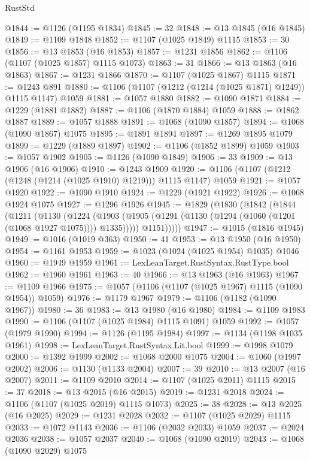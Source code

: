 \begin{lexlean}{RustStd}
\begin{coremodule}
{\begin{coremodule}
{{{{{{{{{{{{{{{{{{{{{{{{{{{{{{{{{{{@1844 := @1126 (@1195 @1834)
@1845 := 32
@1848 := @13 @1845 (@16 @1845)
@1849 := @1109 @1848
@1852 := @1107 (@1025 @1849) @1115
@1853 := 30
@1856 := @13 @1853 (@16 @1853)
@1857 := @1231 @1856
@1862 := @1106 (@1107 (@1025 @1857) @1115 @1073)
@1863 := 31
@1866 := @13 @1863 (@16 @1863)
@1867 := @1231 @1866
@1870 := @1107 (@1025 @1867) @1115
@1871 := @1243 @891
@1880 := @1106 (@1107 (@1212 (@1214 (@1025 @1871) @1249)) @1115 @1147) @1059
@1881 := @1057 @1880
@1882 := @1090 @1871
@1884 := @1229 (@1881 @1882)
@1887 := @1106 (@1870 @1884) @1059
@1888 := @1862 @1887
@1889 := @1057 @1888
@1891 := @1068 (@1090 @1857)
@1894 := @1068 (@1090 @1867) @1075
@1895 := @1891 @1894
@1897 := @1269 @1895 @1079
@1899 := @1229 (@1889 @1897)
@1902 := @1106 (@1852 @1899) @1059
@1903 := @1057 @1902
@1905 := @1126 (@1090 @1849)
@1906 := 33
@1909 := @13 @1906 (@16 @1906)
@1910 := @1243 @1909
@1920 := @1106 (@1107 (@1212 (@1248 (@1214 (@1025 @1910) @1219))) @1115 @1147) @1059
@1921 := @1057 @1920
@1922 := @1090 @1910
@1924 := @1229 (@1921 @1922)
@1926 := @1068 @1924 @1075
@1927 := @1296 @1926
@1945 := @1829
    (@1830
      (@1842
        (@1844
          (@1211
            (@1130
              (@1224
                (@1903 (@1905 (@1291 (@1130 (@1294 (@1060 (@1201 (@1068 @1927 @1075)))) @1335)))))
              @1151)))))
@1947 := @1015 (@1816 @1945)
@1949 := @1016 (@1019 @363)
@1950 := 41
@1953 := @13 @1950 (@16 @1950)
@1954 := @1161 @1953
@1959 := @1023 (@1024 (@1025 @1954) @1035) @1046
@1960 := @1949 @1959
@1961 := LexLeanTarget.RustSyntax.RustType.bool
@1962 := @1960 @1961
@1963 := 40
@1966 := @13 @1963 (@16 @1963)
@1967 := @1109 @1966
@1975 := @1057 (@1106 (@1107 (@1025 @1967) @1115 (@1090 @1954)) @1059)
@1976 := @1179 @1967
@1979 := @1106 (@1182 (@1090 @1967))
@1980 := 36
@1983 := @13 @1980 (@16 @1980)
@1984 := @1109 @1983
@1990 := @1106 (@1107 (@1025 @1984) @1115 @1091) @1059
@1992 := @1057 (@1979 @1990)
@1994 := @1126 (@1195 @1984)
@1997 := @1134 (@1198 @1035 @1961)
@1998 := LexLeanTarget.RustSyntax.Lit.bool
@1999 := @1998 @1079
@2000 := @1392 @1999
@2002 := @1068 @2000 @1075
@2004 := @1060 (@1997 @2002)
@2006 := @1130 (@1133 @2004)
@2007 := 39
@2010 := @13 @2007 (@16 @2007)
@2011 := @1109 @2010
@2014 := @1107 (@1025 @2011) @1115
@2015 := 37
@2018 := @13 @2015 (@16 @2015)
@2019 := @1231 @2018
@2024 := @1106 (@1107 (@1025 @2019) @1115 @1073)
@2025 := 38
@2028 := @13 @2025 (@16 @2025)
@2029 := @1231 @2028
@2032 := @1107 (@1025 @2029) @1115
@2033 := @1072 @1143
@2036 := @1106 (@2032 @2033) @1059
@2037 := @2024 @2036
@2038 := @1057 @2037
@2040 := @1068 (@1090 @2019)
@2043 := @1068 (@1090 @2029) @1075
}}}}}}}}}}}}}}}}}}}}}}}}}}}}}}}}}}}
\end{coremodule}}
\end{coremodule}
\end{lexlean}
